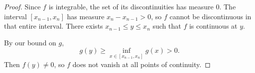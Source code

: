 \documentclass[oneside]{article}
\begin{document}
\begin{enumerate}[label=(\alph*)]
\begin{proof}
        Since $f$ is integrable, the set of its discontinuities has measure $0$. The interval $[x_{n-1}, x_n]$ has measure $x_n - x_{n-1} > 0$, so $f$ cannot be discontinuous in that entire interval. There exists $x_{n-1} \leq y \leq x_n$ such that $f$ is continuous at $y$.

        By our bound on $g$, \[
          g(y) \geq \inf_{x \in [x_{n-1}, x_n]} g(x) > 0 \text{.}
        \] Then $f(y) \neq 0$, so $f$ does not vanish at all points of continuity.
      \end{proof}

  \end{enumerate}
\end{document}
